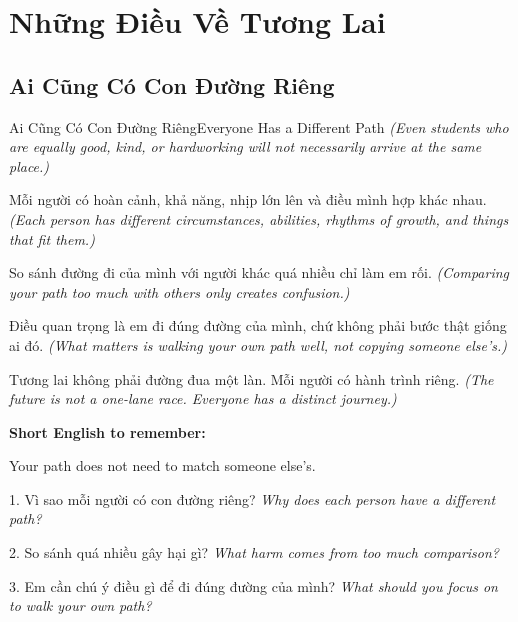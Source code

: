 \chapter{Những Điều Về Tương Lai}

\section{Ai Cũng Có Con Đường Riêng}
\begin{truyen}{Ai Cũng Có Con Đường Riêng}{Everyone Has a Different Path}
\textit{(Even students who are equally good, kind, or hardworking will not necessarily arrive at the same place.)}

Mỗi người có hoàn cảnh, khả năng, nhịp lớn lên và điều mình hợp khác nhau.
\textit{(Each person has different circumstances, abilities, rhythms of growth, and things that fit them.)}

So sánh đường đi của mình với người khác quá nhiều chỉ làm em rối.
\textit{(Comparing your path too much with others only creates confusion.)}

Điều quan trọng là em đi đúng đường của mình, chứ không phải bước thật giống ai đó.
\textit{(What matters is walking your own path well, not copying someone else's.)}
\end{truyen}

\begin{baihoc}
Tương lai không phải đường đua một làn. Mỗi người có hành trình riêng.
\textit{(The future is not a one-lane race. Everyone has a distinct journey.)}
\end{baihoc}

\begin{ghinhoanh}
\textbf{Short English to remember:}

Your path does not need to match someone else's.

\end{ghinhoanh}

\begin{tuhocnhanh}
1. Vì sao mỗi người có con đường riêng? \textit{Why does each person have a different path?}

2. So sánh quá nhiều gây hại gì? \textit{What harm comes from too much comparison?}

3. Em cần chú ý điều gì để đi đúng đường của mình? \textit{What should you focus on to walk your own path?}
\end{tuhocnhanh}
\ngancach

